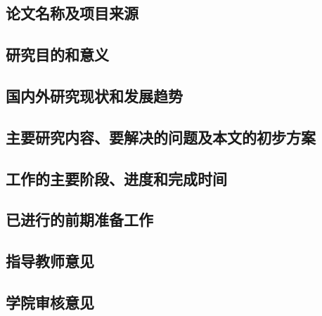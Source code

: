 \documentclass{xduugtp}
\begin{document}
\begin{mcly}
\section{论文名称及项目来源}
\end{mcly}

\begin{yjmdyy}
\section{研究目的和意义}
\end{yjmdyy}

\begin{yjxz}
\section{国内外研究现状和发展趋势}
\end{yjxz}

\begin{yjnr}
\section{主要研究内容、要解决的问题及本文的初步方案}
\end{yjnr}

\begin{gzjd}
\section{工作的主要阶段、进度和完成时间}
\end{gzjd}

\begin{zbgz}
\section{已进行的前期准备工作}
\end{zbgz}

\begin{zdjsyj}
\section{指导教师意见}
\end{zdjsyj}

\begin{xyshyj}
\section{学院审核意见}
\end{xyshyj}
\end{document}
